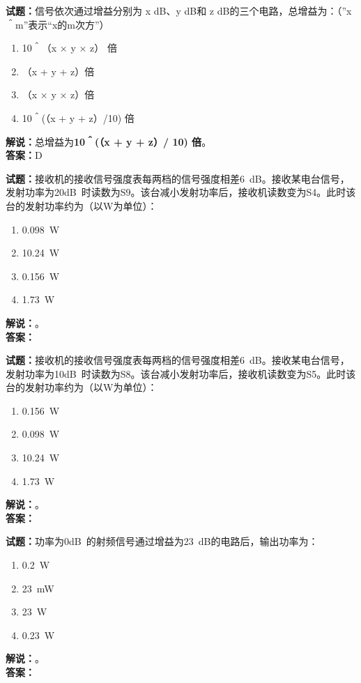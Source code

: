 \documentclass{ctexbook}
\begin{document}
\bigskip




\noindent\textbf{试题：}信号依次通过增益分别为 x dB、y dB和 z dB的三个电路，总增益为：（”x＾m”表示“x的m次方”）
\begin{enumerate}[leftmargin=3em]
\item 10＾（x × y × z） 倍
\item （x + y + z）倍
\item （x × y × z）倍
\item 10＾(（x + y + z）/10) 倍
\end{enumerate}
\noindent\textbf{解说：}总增益为\textbf{10＾(（x + y + z）/ 10) 倍}。\\\noindent\textbf{答案：}D

\bigskip




\noindent\textbf{试题：}接收机的接收信号强度表每两档的信号强度相差\SI{6}{\dB}。接收某电台信号，发射功率为\num{20}\unit[qualifier-mode=combine]{\deci\bel{}}时读数为S9。该台减小发射功率后，接收机读数变为S4。此时该台的发射功率约为（以W为单位）：
\begin{enumerate}[leftmargin=3em]
\item \SI{0.098}{\W}
\item \SI{10.24}{\W}
\item \SI{0.156}{\W}
\item \SI{1.73}{\W}
\end{enumerate}
\noindent\textbf{解说：}\textbf{}。\\\noindent\textbf{答案：}

\bigskip




\noindent\textbf{试题：}接收机的接收信号强度表每两档的信号强度相差\SI{6}{\dB}。接收某电台信号，发射功率为\num{10}\unit[qualifier-mode=combine]{\deci\bel{}}时读数为S8。该台减小发射功率后，接收机读数变为S5。此时该台的发射功率约为（以W为单位）：
\begin{enumerate}[leftmargin=3em]
\item \SI{0.156}{\W}
\item \SI{0.098}{\W}
\item \SI{10.24}{\W}
\item \SI{1.73}{\W}
\end{enumerate}
\noindent\textbf{解说：}\textbf{}。\\\noindent\textbf{答案：}

\bigskip




\noindent\textbf{试题：}功率为\num{0}\unit[qualifier-mode=combine]{\deci\bel{}}的射频信号通过增益为\SI{23}{\dB}的电路后，输出功率为：
\begin{enumerate}[leftmargin=3em]
\item \SI{0.2}{\W}
\item \SI{23}{\mW}
\item \SI{23}{\W}
\item \SI{0.23}{\W}
\end{enumerate}
\noindent\textbf{解说：}\textbf{}。\\\noindent\textbf{答案：}
\end{document}
